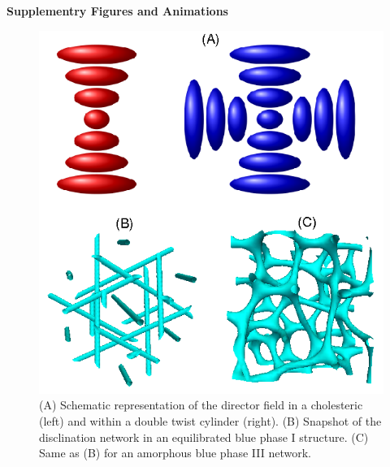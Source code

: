 \documentclass[12pt,twoside]{article}
\begin{document}
\vfill\pagebreak


{\bf Supplementry Figures and Animations}

\begin{figure}[!h]
\begin{center}
\includegraphics[scale=0.8]{support-fig1.png}
\end{center}
\caption{
(A) Schematic representation of the director field
in a cholesteric (left) and within a double twist cylinder (right).
(B) Snapshot of the disclination network in an equilibrated 
blue phase I structure. (C) Same as (B) for an amorphous blue phase III
network.}
\end{figure}

\newpage
\end{document}

